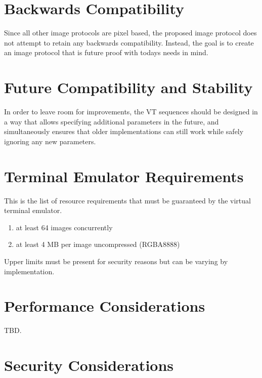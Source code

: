 \documentclass[a4paper]{article}
\begin{document}
\section{Backwards Compatibility} %

Since all other image protocols are pixel based, the proposed image protocol does not
attempt to retain any backwards compatibility. Instead, the goal is to create
an image protocol that is future proof with todays needs in mind.

\section{Future Compatibility and Stability} %

In order to leave room for improvements, the VT sequences should be designed in a way
that allows specifying additional parameters in the future, and simultaneously ensures
that older implementations can still work while safely ignoring any new parameters.

\section{Terminal Emulator Requirements} %

This is the list of resource requirements that must be guaranteed
by the virtual terminal emulator.

\begin{enumerate}
    \item at least 64 images concurrently
    \item at least 4 MB per image uncompressed (RGBA8888)
\end{enumerate}

Upper limits must be present for security reasons but can be varying by implementation.

\section{Performance Considerations} %

TBD.

\section{Security Considerations} %
\end{document}
